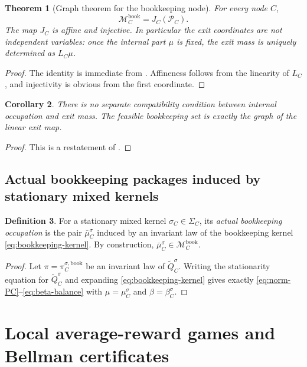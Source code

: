\documentclass[12pt]{article}
\newtheorem{theorem}{Theorem}[section]
\newtheorem{corollary}[theorem]{Corollary}
\theoremstyle{definition}
\newtheorem{definition}[theorem]{Definition}
\newcommand{\1}{\mathbf{1}}
\newcommand{\cM}{\mathcal{M}}
\newcommand{\cP}{\mathcal{P}}
\begin{document}
\begin{theorem}[Graph theorem for the bookkeeping node]
\label{thm:graph-theorem}
For every node $C$,
\[
\cM_C^{\mathrm{book}} = J_C(\cP_C).
\]
The map $J_C$ is affine and injective. In particular the exit coordinates are not
independent variables: once the internal part $\mu$ is fixed, the exit mass is
uniquely determined as $L_C\mu$.
\end{theorem}

\begin{proof}
The identity is immediate from . Affineness follows from the
linearity of $L_C$, and injectivity is obvious from the first coordinate.
\end{proof}

\begin{corollary}
\label{cor:no-vp3}
There is no separate compatibility condition between internal occupation and exit
mass. The feasible bookkeeping set is exactly the graph of the linear exit map.
\end{corollary}

\begin{proof}
This is a restatement of .
\end{proof}

\subsection{Actual bookkeeping packages induced by stationary mixed kernels}

\begin{definition}
\label{def:actual-local-package}
For a stationary mixed kernel $\sigma_C\in\Sigma_C$, its \emph{actual bookkeeping
occupation} is the pair $\bar\mu_C^{\sigma}$ induced by an invariant law of the
bookkeeping kernel \eqref{eq:bookkeeping-kernel}. By construction,
$\bar\mu_C^{\sigma}\in \cM_C^{\mathrm{book}}$.
\end{definition}

\begin{proof}
Let $\pi=\pi_C^{\sigma,\mathrm{book}}$ be an invariant law of
$\widetilde Q_C^{\sigma}$. Writing the stationarity equation for
$\widetilde Q_C^{\sigma}$ and expanding \eqref{eq:bookkeeping-kernel} gives
exactly \eqref{eq:norm-PC}--\eqref{eq:beta-balance} with
$\mu=\mu_C^{\sigma}$ and $\beta=\beta_C^{\sigma}$.
\end{proof}

\section{Local average-reward games and Bellman certificates}
\label{sec:local}
\end{document}
